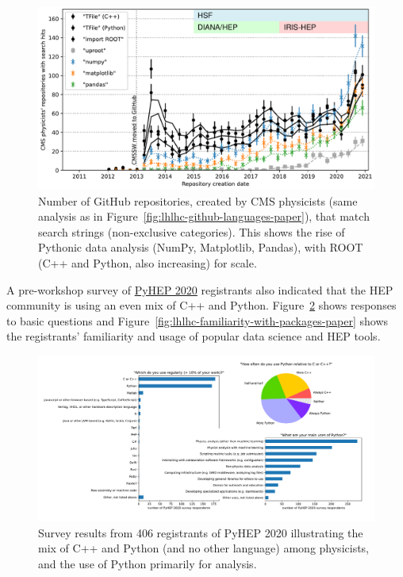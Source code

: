 \documentclass{article}
\begin{document}
\begin{figure}
\centering
\includegraphics[width=0.8\linewidth]{fig/lhlhc-github-overlay-lin-paper.pdf}

\caption{Number of GitHub repositories, created by CMS physicists (same analysis as in Figure~\ref{fig:lhlhc-github-languages-paper}), that match search strings (non-exclusive categories). This shows the rise of Pythonic data analysis (NumPy, Matplotlib, Pandas), with ROOT (C++ and Python, also increasing) for scale. \label{fig:lhlhc-github-overlay-lin-paper}}
\end{figure}

A pre-workshop survey of \href{https://indico.cern.ch/e/PyHEP2020}{PyHEP 2020} registrants also indicated that the HEP community is using an even mix of C++ and Python. Figure~\ref{fig:pyhep2020-survey-paper} shows responses to basic questions and Figure~\ref{fig:lhlhc-familiarity-with-packages-paper} shows the registrants' familiarity and usage of popular data science and HEP tools.

\begin{figure}
\centering
\includegraphics[width=0.8\linewidth]{fig/pyhep2020-survey-paper.pdf}

\caption{Survey results from 406 registrants of PyHEP 2020 illustrating the mix of C++ and Python (and no other language) among physicists, and the use of Python primarily for analysis. \label{fig:pyhep2020-survey-paper}}
\end{figure}
\end{document}
